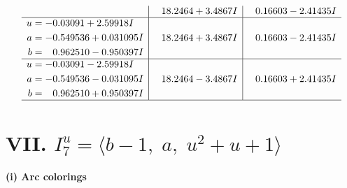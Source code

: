 \documentclass[1p]{elsarticle_modified}
\theoremstyle{definition}
\begin{document}
$$\begin{array}{c|c|c}
 & \phantom{-}18.2464 + 3.4867 I & \phantom{-}0.16603 - 2.41435 I \\ \hline\begin{aligned}
u &= -0.03091 + 2.59918 I \\
a &= -0.549536 + 0.031095 I \\
b &= \phantom{-}0.962510 - 0.950397 I\end{aligned}
 & \phantom{-}18.2464 + 3.4867 I & \phantom{-}0.16603 - 2.41435 I \\ \hline\begin{aligned}
u &= -0.03091 - 2.59918 I \\
a &= -0.549536 - 0.031095 I \\
b &= \phantom{-}0.962510 + 0.950397 I\end{aligned}
 & \phantom{-}18.2464 - 3.4867 I & \phantom{-}0.16603 + 2.41435 I\\
 \hline 
 \end{array}$$\newpage\newpage\renewcommand{\arraystretch}{1}
\centering \section*{VII. $I^u_{7}= \langle b-1,\;a,\;u^2+u+1 \rangle$}
\flushleft \textbf{(i) Arc colorings}\\
\end{document}
